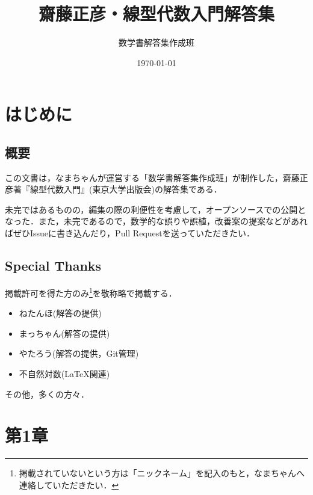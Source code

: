 \documentclass[uplatex,dvipdfmx,a4paper,10pt,fleqn]{jsarticle}
\begin{document}
\title{齋藤正彦・線型代数入門解答集}
\author{数学書解答集作成班}
\date{\today}
\maketitle
\begin{multicols*}{3}
    \tableofcontents
\end{multicols*}

\newpage

\section*{はじめに}


\subsection*{概要}

この文書は，なまちゃんが運営する「数学書解答集作成班」が制作した，齋藤正彦著『線型代数入門』(東京大学出版会)の解答集である．

未完ではあるものの，編集の際の利便性を考慮して，オープンソースでの公開となった．また，未完であるので，数学的な誤りや誤植，改善案の提案などがあればぜひIssueに書き込んだり，Pull Requestを送っていただきたい．


\subsection*{Special Thanks}

掲載許可を得た方のみ\footnote{掲載されていないという方は「ニックネーム」を記入のもと，なまちゃんへ連絡していただきたい．}を敬称略で掲載する．
\begin{itemize}
    \item ねたんほ(解答の提供)
    \item まっちゃん(解答の提供)
    \item やたろう(解答の提供，Git管理)
    \item 不自然対数(\LaTeX 関連)
\end{itemize}

その他，多くの方々．

\newpage 
\section*{第1章}
\end{document}
